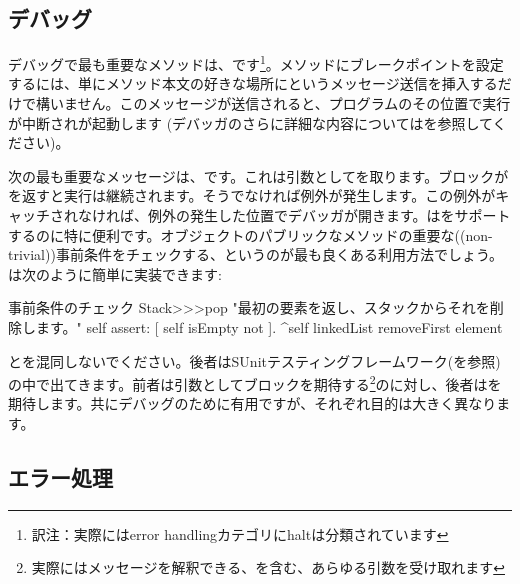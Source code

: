 \documentclass[a4paper,10pt,twoside]{book}
\begin{document}

\subsection{デバッグ}

デバッグで最も重要なメソッドは、です\footnote{訳注：実際にはerror handlingカテゴリにhaltは分類されています}。メソッドにブレークポイントを設定するには、単にメソッド本文の好きな場所にというメッセージ送信を挿入するだけで構いません。このメッセージが送信されると、プログラムのその位置で実行が中断されが起動します
(デバッガのさらに詳細な内容についてはを参照してください)。


次の最も重要なメッセージは、です。これは引数としてを取ります。ブロックがを返すと実行は継続されます。そうでなければ例外が発生します。この例外がキャッチされなければ、例外の発生した位置でデバッガが開きます。はをサポートするのに特に便利です。オブジェクトのパブリックなメソッドの重要な((non-trivial))事前条件をチェックする、というのが最も良くある利用方法でしょう。は次のように簡単に実装できます:

\begin{method}{事前条件のチェック}
Stack>>>pop
    "最初の要素を返し、スタックからそれを削除します。"
    self assert: [ self isEmpty not ].
    ^self linkedList removeFirst element
\end{method}

とを混同しないでください。後者はSUnitテスティングフレームワーク(を参照)の中で出てきます。前者は引数としてブロックを期待する\footnote{実際にはメッセージを解釈できる、を含む、あらゆる引数を受け取れます}のに対し、後者はを期待します。共にデバッグのために有用ですが、それぞれ目的は大きく異なります。

\subsection{エラー処理}
\end{document}
